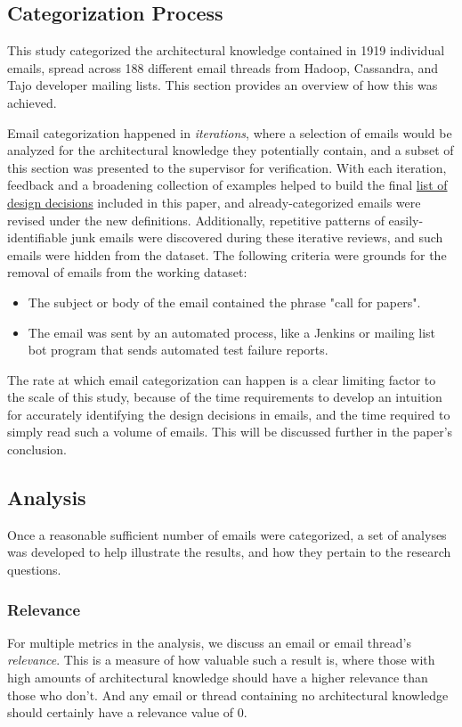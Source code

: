 \documentclass[a4paper, 12pt]{article}
\begin{document}
	\subsection{Categorization Process}
		This study categorized the architectural knowledge contained in 1919 individual emails, spread across 188 different email threads from Hadoop, Cassandra, and Tajo developer mailing lists. This section provides an overview of how this was achieved.
		
		Email categorization happened in \textit{iterations}, where a selection of emails would be analyzed for the architectural knowledge they potentially contain, and a subset of this section was presented to the supervisor for verification. With each iteration, feedback and a broadening collection of examples helped to build the final \hyperref[sec:design-decisions]{list of design decisions} included in this paper, and already-categorized emails were revised under the new definitions. Additionally, repetitive patterns of easily-identifiable junk emails were discovered during these iterative reviews, and such emails were hidden from the dataset. The following criteria were grounds for the removal of emails from the working dataset:
		
		\begin{itemize}
			\item The subject or body of the email contained the phrase "call for papers".
			\item The email was sent by an automated process, like a Jenkins or mailing list bot program that sends automated test failure reports.
		\end{itemize}
	
		The rate at which email categorization can happen is a clear limiting factor to the scale of this study, because of the time requirements to develop an intuition for accurately identifying the design decisions in emails, and the time required to simply read such a volume of emails. This will be discussed further in the paper's conclusion.
		
	\subsection{Analysis}
		Once a reasonable sufficient number of emails were categorized, a set of analyses was developed to help illustrate the results, and how they pertain to the research questions.
		
		\subsubsection{Relevance}
			For multiple metrics in the analysis, we discuss an email or email thread's \textit{relevance}. This is a measure of how valuable such a result is, where those with high amounts of architectural knowledge should have a higher relevance than those who don't. And any email or thread containing no architectural knowledge should certainly have a relevance value of 0.
			
\end{document}
